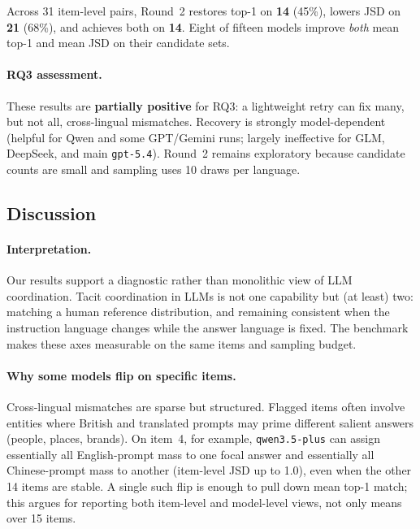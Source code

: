 \documentclass[11pt]{article}
\begin{document}
Across 31 item-level pairs, Round~2 restores top-1 on \textbf{14} (45\%), lowers JSD on \textbf{21} (68\%), and achieves both on \textbf{14}. Eight of fifteen models improve \emph{both} mean top-1 and mean JSD on their candidate sets.

\paragraph{RQ3 assessment.}
These results are \textbf{partially positive} for RQ3: a lightweight retry can fix many, but not all, cross-lingual mismatches. Recovery is strongly model-dependent (helpful for Qwen and some GPT/Gemini runs; largely ineffective for GLM, DeepSeek, and main \texttt{gpt-5.4}). Round~2 remains exploratory because candidate counts are small and sampling uses 10 draws per language.

\subsection{Discussion}
\label{sec:discussion}

\paragraph{Interpretation.}
Our results support a diagnostic rather than monolithic view of LLM coordination. Tacit coordination in LLMs is not one capability but (at least) two: matching a human reference distribution, and remaining consistent when the instruction language changes while the answer language is fixed. The benchmark makes these axes measurable on the same items and sampling budget.

\paragraph{Why some models flip on specific items.}
Cross-lingual mismatches are sparse but structured. Flagged items often involve entities where British and translated prompts may prime different salient answers (people, places, brands). On item~4, for example, \texttt{qwen3.5-plus} can assign essentially all English-prompt mass to one focal answer and essentially all Chinese-prompt mass to another (item-level JSD up to 1.0), even when the other 14 items are stable. A single such flip is enough to pull down mean top-1 match; this argues for reporting both item-level and model-level views, not only means over 15 items.
\end{document}
